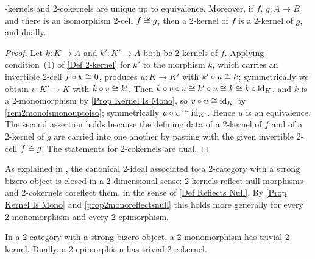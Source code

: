 \begin{corollary}
  \label{corollkeruniqueuptoequiv}   -kernels and 2-cokernels are unique up to equivalence. Moreover, if \(f\), \(g\colon A\to B\) and there is an isomorphism 2-cell \(f\cong g\), then a 2-kernel of \(f\) is a 2-kernel of \(g\), and dually.
\end{corollary}

\begin{proof}
  \leanok
  Let \(k\colon K\to A\) and \(k'\colon K'\to A\) both be 2-kernels of \(f\). Applying condition~(1) of \ref{Def 2-kernel} for \(k'\) to the morphism \(k\), which carries an invertible 2-cell \(f\circ k\cong 0\), produces \(u\colon K\to K'\) with \(k'\circ u\cong k\); symmetrically we obtain \(v\colon K'\to K\) with \(k\circ v\cong k'\). Then \(k\circ v\circ u\cong k'\circ u\cong k\cong k\circ\operatorname{id}_{K}\), and \(k\) is a 2-monomorphism by \prox\ref{Prop Kernel Is Mono}, so \(v\circ u\cong\operatorname{id}_{K}\) by \remx\ref{rem2monoismonouptoiso}; symmetrically \(u\circ v\cong\operatorname{id}_{K'}\). Hence \(u\) is an equivalence. The second assertion holds because the defining data of a 2-kernel of \(f\) and of a 2-kernel of \(g\) are carried into one another by pasting with the given invertible 2-cell \(f\cong g\). The statements for 2-cokernels are dual.
\end{proof}

\begin{remark}
  \label{Rem Ideal Closed}
  As explained in \cite[Definition~2.20 and Proposition~4.11]{CavJanMes25}, the canonical 2-ideal associated to a 2-category with a strong bizero object is closed in a 2-dimensional sense: 2-kernels reflect null morphisms and 2-cokernels coreflect them, in the sense of \ref{Def Reflects Null}. By \prox\ref{Prop Kernel Is Mono} and \prox\ref{prop2monoreflectsnull} this holds more generally for every 2-monomorphism and every 2-epimorphism.
\end{remark}

\begin{lemma}
  \label{2-Mono Trivial Kernel}   \leanok
  In a 2-category with a strong bizero object, a 2-monomorphism has trivial 2-kernel. Dually, a 2-epimorphism has trivial 2-cokernel.
\end{lemma}

